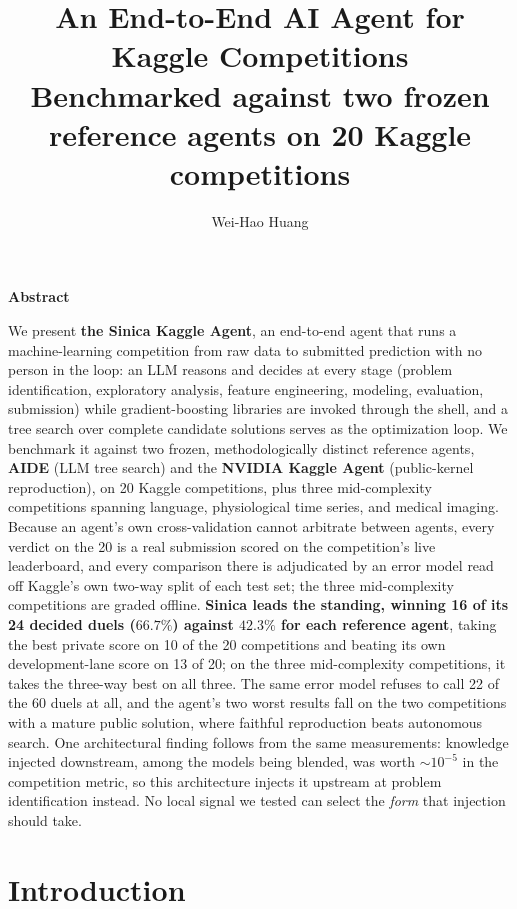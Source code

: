 \documentclass[11pt,a4paper]{article}
\title{\textbf{An End-to-End AI Agent for Kaggle Competitions}\\
\large Benchmarked against two frozen reference agents on 20 Kaggle competitions}
\author{Wei-Hao Huang}
\date{}
\begin{document}
\maketitle

\begin{center}\textbf{\large Abstract}\end{center}
\noindent We present \textbf{the Sinica Kaggle Agent}, an end-to-end agent that runs a machine-learning competition from raw data to submitted prediction with no person in the loop: an LLM reasons and decides at every stage (problem identification, exploratory analysis, feature engineering, modeling, evaluation, submission) while gradient-boosting libraries are invoked through the shell, and a tree search over complete candidate solutions serves as the optimization loop. We benchmark it against two frozen, methodologically distinct reference agents, \textbf{AIDE} (LLM tree search) and the \textbf{NVIDIA Kaggle Agent} (public-kernel reproduction), on 20 Kaggle competitions, plus three mid-complexity competitions spanning language, physiological time series, and medical imaging. Because an agent's own cross-validation cannot arbitrate between agents, every verdict on the 20 is a real submission scored on the competition's live leaderboard, and every comparison there is adjudicated by an error model read off Kaggle's own two-way split of each test set; the three mid-complexity competitions are graded offline. \textbf{Sinica leads the standing, winning 16 of its 24 decided duels ($66.7\%$) against $42.3\%$ for each reference agent}, taking the best private score on 10 of the 20 competitions and beating its own development-lane score on 13 of 20; on the three mid-complexity competitions, it takes the three-way best on all three. The same error model refuses to call 22 of the 60 duels at all, and the agent's two worst results fall on the two competitions with a mature public solution, where faithful reproduction beats autonomous search. One architectural finding follows from the same measurements: knowledge injected downstream, among the models being blended, was worth ${\sim}10^{-5}$ in the competition metric, so this architecture injects it upstream at problem identification instead. No local signal we tested can select the \emph{form} that injection should take.

\vspace{0.5em}

\section{Introduction}
\end{document}
